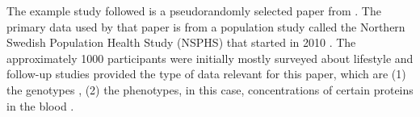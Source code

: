 The example study followed is a pseudorandomly selected paper
from \cite{ahsan2017relative}. The primary data used by that paper is
from a population study called the Northern Swedish Population
Health Study (NSPHS) that started in 2010 \cite{igl2010northern}. 
The approximately 1000 participants were initially mostly surveyed
about lifestyle \cite{igl2010northern} and follow-up studies
provided the type of data relevant for this paper, 
which are (1) the genotypes \cite{johansson2013identification},
(2) the phenotypes, in this case, concentrations of certain proteins in the 
blood \cite{enroth2014strong,enroth2015effect}.

